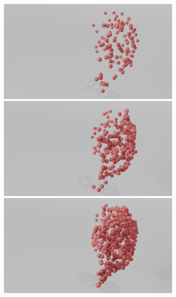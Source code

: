         \begin{figure}[htb]
          \centering
          \begin{subfigure}[t]{\textwidth+20pt\relax}
            \includegraphics[width=\dimexpr\linewidth-20pt\relax]{figures/percent/128_part.png}
            \includegraphics[width=\dimexpr\linewidth-20pt\relax]{figures/percent/256_part.png}
            \includegraphics[width=\dimexpr\linewidth-20pt\relax]{figures/percent/512_part.png}

\end{subfigure}
\end{figure}
